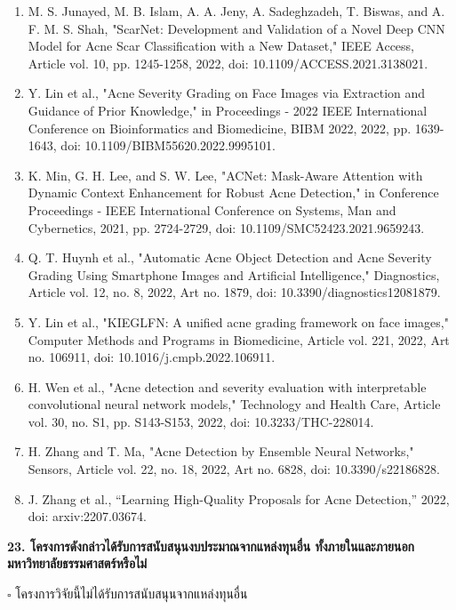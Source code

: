 \documentclass[16pt]{extarticle}
\begin{document}
\begin{enumerate}
  Nitinawarat, M. Pongprutthipan, and K. Piromsopa, "Acne detection with
  deep neural networks," in ACM International Conference Proceeding
  Series, 2020, pp. 53-56, doi: 10.1145/3421558.3421566.
\item
  M. S. Junayed, M. B. Islam, A. A. Jeny, A. Sadeghzadeh, T. Biswas, and
  A. F. M. S. Shah, "ScarNet: Development and Validation of a Novel Deep
  CNN Model for Acne Scar Classification with a New Dataset," IEEE
  Access, Article vol. 10, pp. 1245-1258, 2022, doi:
  10.1109/ACCESS.2021.3138021.
\item
  Y. Lin et al., "Acne Severity Grading on Face Images via Extraction
  and Guidance of Prior Knowledge," in Proceedings - 2022 IEEE
  International Conference on Bioinformatics and Biomedicine, BIBM 2022,
  2022, pp. 1639-1643, doi: 10.1109/BIBM55620.2022.9995101.
\item
  K. Min, G. H. Lee, and S. W. Lee, "ACNet: Mask-Aware Attention with
  Dynamic Context Enhancement for Robust Acne Detection," in Conference
  Proceedings - IEEE International Conference on Systems, Man and
  Cybernetics, 2021, pp. 2724-2729, doi: 10.1109/SMC52423.2021.9659243.
\item
  Q. T. Huynh et al., "Automatic Acne Object Detection and Acne Severity
  Grading Using Smartphone Images and Artificial Intelligence,"
  Diagnostics, Article vol. 12, no. 8, 2022, Art no. 1879, doi:
  10.3390/diagnostics12081879.
\item
  Y. Lin et al., "KIEGLFN: A unified acne grading framework on face
  images," Computer Methods and Programs in Biomedicine, Article vol.
  221, 2022, Art no. 106911, doi: 10.1016/j.cmpb.2022.106911.
\item
  H. Wen et al., "Acne detection and severity evaluation with
  interpretable convolutional neural network models," Technology and
  Health Care, Article vol. 30, no. S1, pp. S143-S153, 2022, doi:
  10.3233/THC-228014.
\item
  H. Zhang and T. Ma, "Acne Detection by Ensemble Neural Networks,"
  Sensors, Article vol. 22, no. 18, 2022, Art no. 6828, doi:
  10.3390/s22186828.
\item
  J. Zhang et al., ``Learning High-Quality Proposals for Acne
  Detection,'' 2022, doi: arxiv:2207.03674.
\end{enumerate}

\textbf{23. โครงการดังกล่าวได้รับการสนับสนุนงบประมาณจากแหล่งทุนอื่น
ทั้งภายในและภายนอกมหาวิทยาลัยธรรมศาสตร์หรือไม่}

$\square$ โครงการวิจัยนี้ไม่ได้รับการสนับสนุนจากแหล่งทุนอื่น
\end{document}
